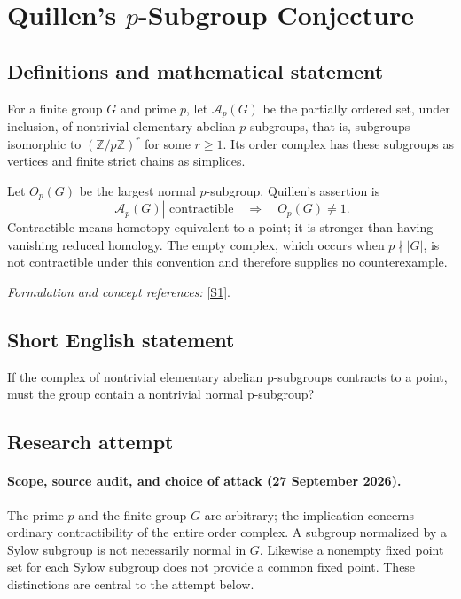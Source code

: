 \documentclass[11pt]{article}
\begin{document}
\section*{\texorpdfstring{Quillen's $p$-Subgroup Conjecture}{Quillen's \$p\$-Subgroup Conjecture}}\label{statement}
\subsection{Definitions and mathematical statement}
For a finite group $G$ and prime $p$, let $\mathcal A_p(G)$ be the partially ordered set, under inclusion, of nontrivial elementary abelian $p$-subgroups, that is, subgroups isomorphic to $({\mathbb{Z}}/p{\mathbb{Z}})^r$ for some $r\ge1$. Its order complex has these subgroups as vertices and finite strict chains as simplices.

Let $O_p(G)$ be the largest normal $p$-subgroup. Quillen's assertion is
\[
 |\mathcal A_p(G)|\text{ contractible}
                   \quad\Longrightarrow\quad O_p(G)\ne1.
\]
Contractible means homotopy equivalent to a point; it is stronger than having vanishing reduced homology. The empty complex, which occurs when $p\nmid|G|$, is not contractible under this convention and therefore supplies no counterexample.
\par\smallskip\textit{Formulation and concept references:} \href{https://eprints.lancs.ac.uk/id/eprint/158837/1/dm_rev9.pdf}{[S1]}.

\subsection{Short English statement}
If the complex of nontrivial elementary abelian p-subgroups contracts to a point, must the group contain a nontrivial normal p-subgroup?
\subsection{Research attempt}

\paragraph{Scope, source audit, and choice of attack (27 September 2026).}
The prime $p$ and the finite group $G$ are arbitrary; the implication concerns
ordinary contractibility of the entire order complex. A subgroup normalized by
a Sylow subgroup is not necessarily normal in $G$. Likewise a nonempty fixed
point set for each Sylow subgroup does not provide a common fixed point.
These distinctions are central to the attempt below.
\end{document}
